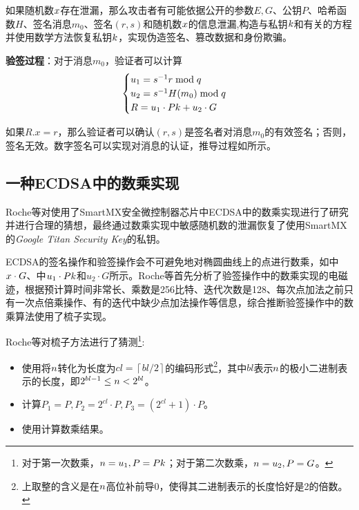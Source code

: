 {	如果随机数$x$存在泄漏，那么攻击者有可能依据公开的参数$E,G$、公钥$P$、哈希函数$H$、签名消息$m_0$、签名$(r,s)$和随机数$x$的信息泄漏,构造与私钥$k$和有关的方程并使用数学方法恢复私钥$k$，实现伪造签名、篡改数据和身份欺骗。
	
	\textbf{验签过程}：对于消息$m_0$，验证者可以计算
	\begin{equation}\label{eq:prepare-verify}
	\begin{cases}
		u_1=s^{-1}r\bmod q\\
		u_2=s^{-1}H(m_0)\bmod q\\
		R=u_1\cdot Pk+u_2\cdot G
	\end{cases}
	\end{equation}
	
	如果$R.x=r$，那么验证者可以确认$(r,s)$是签名者对消息$m_0$的有效签名；否则，签名无效。数字签名可以实现对消息的认证，推导过程如所示。
	
	\subsection{一种ECDSA中的数乘实现}
	Roche等\citep{Roche21}对使用了SmartMX\citep{p5x}安全微控制器芯片中ECDSA中的数乘实现进行了研究并进行合理的猜想，最终通过数乘实现中敏感随机数的泄漏恢复了使用SmartMX\citep{p5x}的\textit{Google Titan Security Key}\citep{Titan}的私钥。
	
	ECDSA的签名操作和验签操作会不可避免地对椭圆曲线上的点进行数乘，如中$x\cdot G$、中$u_1\cdot Pk$和$u_2\cdot G$所示。Roche等\citep{Roche21}首先分析了验签操作中的数乘实现的电磁迹，根据预计算时间非常长、乘数是256比特、迭代次数是128、每次点加法之前只有一次点倍乘操作、有的迭代中缺少点加法操作等信息，综合推断验签操作中的数乘算法使用了梳子\citep{Lim94}实现。
	
	Roche等\citep{Roche21}对梳子方法进行了猜测\footnote{对于第一次数乘，$n=u_1,P=Pk$；对于第二次数乘，$n=u_2,P=G$。}:
	
	\begin{itemize}
		\item 使用将$n$转化为长度为$cl=\left\lceil bl/2\right\rceil$的编码形式\footnote{上取整的含义是在$n$高位补前导0，使得其二进制表示的长度恰好是2的倍数。}，其中$bl$表示$n$的极小二进制表示的长度，即$2^{bl-1}\le n<2^{bl}$。
		\item 计算$P_1=P,P_2=2^{cl}\cdot P,P_3=\left( 2^{cl}+1\right) \cdot P$。
		\item 使用计算数乘结果。
	\end{itemize}
	
}
